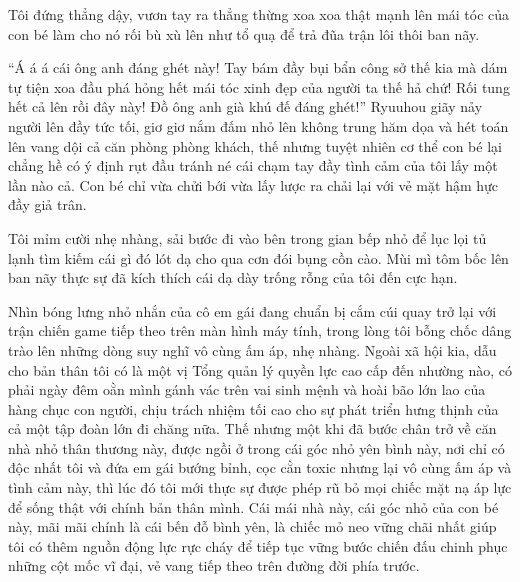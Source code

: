 \documentclass[../main.tex]{subfiles}
\begin{document}
Tôi đứng thẳng dậy, vươn tay ra thẳng thừng xoa xoa thật mạnh lên mái tóc của con bé làm cho nó rối bù xù lên như tổ quạ để trả đũa trận lôi thôi ban nãy.

``Á á á cái ông anh đáng ghét này! Tay bám đầy bụi bẩn công sở thế kia mà dám tự tiện xoa đầu phá hỏng hết mái tóc xinh đẹp của người ta thế hả chứ! Rối tung hết cả lên rồi đây này! Đồ ông anh già khú đế đáng ghét!'' Ryuuhou giãy nảy người lên đầy tức tối, giơ giơ nắm đấm nhỏ lên không trung hăm dọa và hét toán lên vang dội cả căn phòng phòng khách, thế nhưng tuyệt nhiên cơ thể con bé lại chẳng hề có ý định rụt đầu tránh né cái chạm tay đầy tình cảm của tôi lấy một lần nào cả. Con bé chỉ vừa chửi bới vừa lấy lược ra chải lại với vẻ mặt hậm hực đầy giả trân.

Tôi mỉm cười nhẹ nhàng, sải bước đi vào bên trong gian bếp nhỏ để lục lọi tủ lạnh tìm kiếm cái gì đó lót dạ cho qua cơn đói bụng cồn cào. Mùi mì tôm bốc lên ban nãy thực sự đã kích thích cái dạ dày trống rỗng của tôi đến cực hạn.

Nhìn bóng lưng nhỏ nhắn của cô em gái đang chuẩn bị cắm cúi quay trở lại với trận chiến game tiếp theo trên màn hình máy tính, trong lòng tôi bỗng chốc dâng trào lên những dòng suy nghĩ vô cùng ấm áp, nhẹ nhàng. Ngoài xã hội kia, dẫu cho bản thân tôi có là một vị Tổng quản lý quyền lực cao cấp đến nhường nào, có phải ngày đêm oằn mình gánh vác trên vai sinh mệnh và hoài bão lớn lao của hàng chục con người, chịu trách nhiệm tối cao cho sự phát triển hưng thịnh của cả một tập đoàn lớn đi chăng nữa. Thế nhưng một khi đã bước chân trở về căn nhà nhỏ thân thương này, được ngồi ở trong cái góc nhỏ yên bình này, nơi chỉ có độc nhất tôi và đứa em gái bướng bỉnh, cọc cằn toxic nhưng lại vô cùng ấm áp và tình cảm này, thì lúc đó tôi mới thực sự được phép rũ bỏ mọi chiếc mặt nạ áp lực để sống thật với chính bản thân mình. Cái mái nhà này, cái góc nhỏ của con bé này, mãi mãi chính là cái bến đỗ bình yên, là chiếc mỏ neo vững chãi nhất giúp tôi có thêm nguồn động lực rực cháy để tiếp tục vững bước chiến đấu chinh phục những cột mốc vĩ đại, vẻ vang tiếp theo trên đường đời phía trước.
\end{document}
